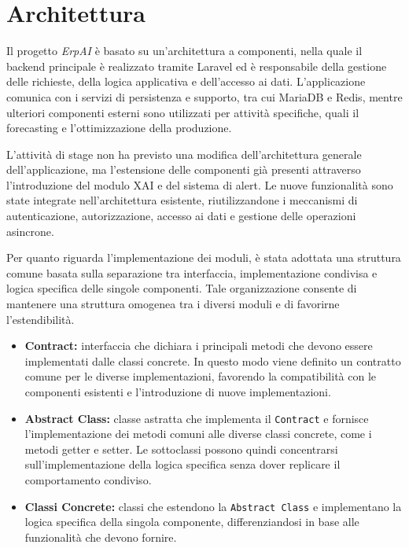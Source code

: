 \section{Architettura}
\label{sec:architettura}
Il progetto \textit{ErpAI} è basato su un'architettura a componenti, nella quale il backend principale è realizzato tramite Laravel ed è responsabile della gestione delle richieste, 
della logica applicativa e dell'accesso ai dati. L'applicazione comunica con i servizi di persistenza e supporto, tra cui MariaDB e Redis, mentre ulteriori componenti esterni 
sono utilizzati per attività specifiche, quali il forecasting e l'ottimizzazione della produzione.

L'attività di stage non ha previsto una modifica dell'architettura generale dell'applicazione, ma l'estensione delle componenti già presenti attraverso l'introduzione del modulo 
XAI e del sistema di alert. Le nuove funzionalità sono state integrate nell'architettura esistente, riutilizzandone i meccanismi di autenticazione, autorizzazione, accesso ai dati 
e gestione delle operazioni asincrone.

Per quanto riguarda l'implementazione dei moduli, è stata adottata una struttura comune basata sulla separazione tra interfaccia, implementazione condivisa e logica specifica delle singole componenti. Tale organizzazione consente di mantenere una struttura omogenea tra i diversi moduli e di favorirne l'estendibilità.

\begin{itemize}
  \item \textbf{Contract:} interfaccia che dichiara i principali metodi che devono essere implementati dalle classi concrete. In questo modo viene definito un contratto 
    comune per le diverse implementazioni, favorendo la compatibilità con le componenti esistenti e l'introduzione di nuove implementazioni.
  \item \textbf{Abstract Class:} classe astratta che implementa il \texttt{Contract} e fornisce l'implementazione dei metodi comuni alle diverse classi concrete, come i metodi 
    getter e setter. Le sottoclassi possono quindi concentrarsi sull'implementazione della logica specifica senza dover replicare il comportamento condiviso.
  \item \textbf{Classi Concrete:} classi che estendono la \texttt{Abstract Class} e implementano la logica specifica della singola componente, differenziandosi in base alle 
    funzionalità che devono fornire.
\end{itemize}


